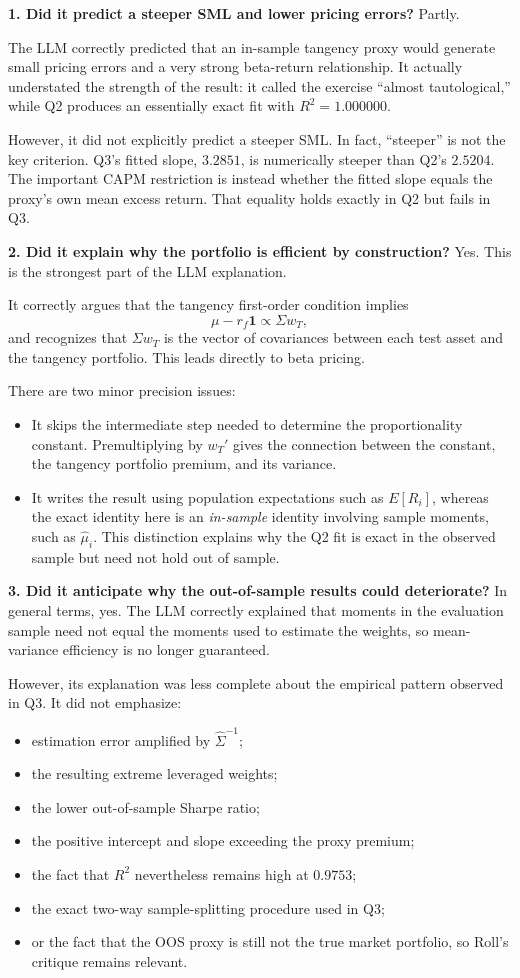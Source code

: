 \documentclass[11pt]{article}
\newenvironment{tight}
  {\begin{itemize}\setlength{\itemsep}{3pt}\setlength{\parskip}{0pt}%
   \setlength{\topsep}{3pt}\setlength{\leftmargini}{1.4em}}
  {\end{itemize}}
\begin{document}
\textbf{1. Did it predict a steeper SML and lower pricing errors?} Partly.

The LLM correctly predicted that an in-sample tangency proxy would generate
small pricing errors and a very strong beta-return relationship. It actually
understated the strength of the result: it called the exercise ``almost
tautological,'' while Q2 produces an essentially exact fit with
$R^2 = 1.000000$.

However, it did not explicitly predict a steeper SML. In fact, ``steeper'' is
not the key criterion. Q3's fitted slope, $3.2851$, is numerically steeper than
Q2's $2.5204$. The important CAPM restriction is instead whether the fitted
slope equals the proxy's own mean excess return. That equality holds exactly in
Q2 but fails in Q3.

\textbf{2. Did it explain why the portfolio is efficient by construction?} Yes.
This is the strongest part of the LLM explanation.

It correctly argues that the tangency first-order condition implies
\[
\mu - r_f\mathbf{1} \propto \Sigma w_T ,
\]
and recognizes that $\Sigma w_T$ is the vector of covariances between each test
asset and the tangency portfolio. This leads directly to beta pricing.

There are two minor precision issues:
\begin{tight}
\item It skips the intermediate step needed to determine the proportionality
constant. Premultiplying by $w_T'$ gives the connection between the constant,
the tangency portfolio premium, and its variance.
\item It writes the result using population expectations such as $E[R_i]$,
whereas the exact identity here is an \emph{in-sample} identity involving
sample moments, such as $\hat\mu_i$. This distinction explains why the Q2 fit
is exact in the observed sample but need not hold out of sample.
\end{tight}

\textbf{3. Did it anticipate why the out-of-sample results could deteriorate?}
In general terms, yes. The LLM correctly explained that moments in the
evaluation sample need not equal the moments used to estimate the weights, so
mean-variance efficiency is no longer guaranteed.

However, its explanation was less complete about the empirical pattern observed
in Q3. It did not emphasize:
\begin{tight}
\item estimation error amplified by $\hat\Sigma^{-1}$;
\item the resulting extreme leveraged weights;
\item the lower out-of-sample Sharpe ratio;
\item the positive intercept and slope exceeding the proxy premium;
\item the fact that $R^2$ nevertheless remains high at $0.9753$;
\item the exact two-way sample-splitting procedure used in Q3;
\item or the fact that the OOS proxy is still not the true market portfolio, so
Roll's critique remains relevant.
\end{tight}
\end{document}
